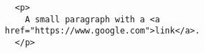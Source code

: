 \documentclass{article}
\begin{document}
\begin{verbatim}
  <p>
    A small paragraph with a <a href="https://www.google.com">link</a>.
  </p>
\end{verbatim}
\end{document}
